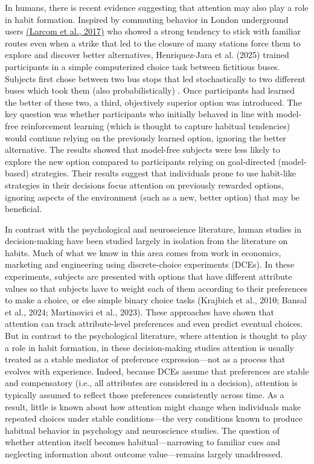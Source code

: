 In humans, there is recent evidence suggesting that attention may also play a role in habit formation. Inspired by commuting behavior in London underground users \href{https://www.zotero.org/google-docs/?jR8OZb}{(Larcom et al., 2017)} who showed a strong tendency to stick with familiar routes even when a strike that led to the closure of many stations force them to explore and discover better alternatives, Henriquez-Jara et al. (2025) trained participants in a simple computerized choice task between fictitious buses. Subjects first chose between two bus stops that led stochastically to two different buses which took them (also probabilistically) . Once participants had learned the better of these two, a third, objectively superior option was introduced. The key question was whether participants who initially behaved in line with model-free reinforcement learning (which is thought to capture habitual tendencies) would continue relying on the previously learned option, ignoring the better alternative. The results showed that model-free subjects were less likely to explore the new option compared to participants relying on goal-directed (model-based) strategies. Their results suggest that individuals prone to use habit-like strategies in their decisions focus attention on previously rewarded options, ignoring aspects of the environment (such as a new, better option) that may be beneficial.

In contrast with the psychological and neuroscience literature, human studies in decision-making have been studied largely in isolation from the literature on habits. Much of what we know in this area comes from work in economics, marketing and engineering using discrete-choice experiments (DCEs). In these experiments, subjects are presented with options that have different attribute values so that subjects have to weight each of them according to their preferences to make a choice, or else simple binary choice tasks (Krajbich et al., 2010; Bansal et al., 2024; Martinovici et al., 2023). These approaches have shown that attention can track attribute-level preferences and even predict eventual choices. But in contrast to the psychological literature, where attention is thought to play a role in habit formation, in these decision-making studies attention is usually treated as a stable mediator of preference expression---not as a process that evolves with experience. Indeed, because DCEs assume that preferences are stable and compensatory (i.e., all attributes are considered in a decision), attention is typically assumed to reflect those preferences consistently across time. As a result, little is known about how attention might change when individuals make repeated choices under stable conditions---the very conditions known to produce habitual behavior in psychology and neuroscience studies. The question of whether attention itself becomes habitual---narrowing to familiar cues and neglecting information about outcome value---remains largely unaddressed.

